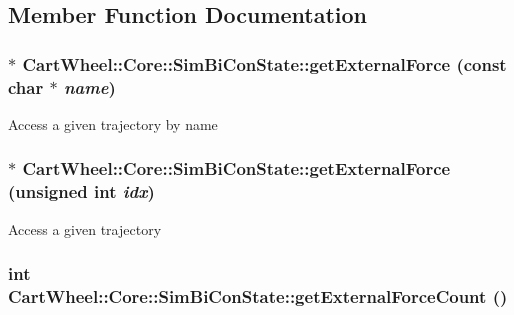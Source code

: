 \subsection{Member Function Documentation}
\hypertarget{classCartWheel_1_1Core_1_1SimBiConState_a3a05f5c94476bda0e564b9442c0fc489}{
\subsubsection[{getExternalForce}]{$\ast$ CartWheel::Core::SimBiConState::getExternalForce (const char $\ast$ {\em name})}}
\label{classCartWheel_1_1Core_1_1SimBiConState_a3a05f5c94476bda0e564b9442c0fc489}
Access a given trajectory by name \hypertarget{classCartWheel_1_1Core_1_1SimBiConState_a9cb8e512df76fac9c6b5b01d5db7440d}{
\subsubsection[{getExternalForce}]{$\ast$ CartWheel::Core::SimBiConState::getExternalForce (unsigned int {\em idx})}}
\label{classCartWheel_1_1Core_1_1SimBiConState_a9cb8e512df76fac9c6b5b01d5db7440d}
Access a given trajectory \hypertarget{classCartWheel_1_1Core_1_1SimBiConState_a694c5a6d1749c347bec9e0b9009aa7ad}{
\subsubsection[{getExternalForceCount}]{\setlength{\rightskip}{0pt plus 5cm}int CartWheel::Core::SimBiConState::getExternalForceCount ()}}
